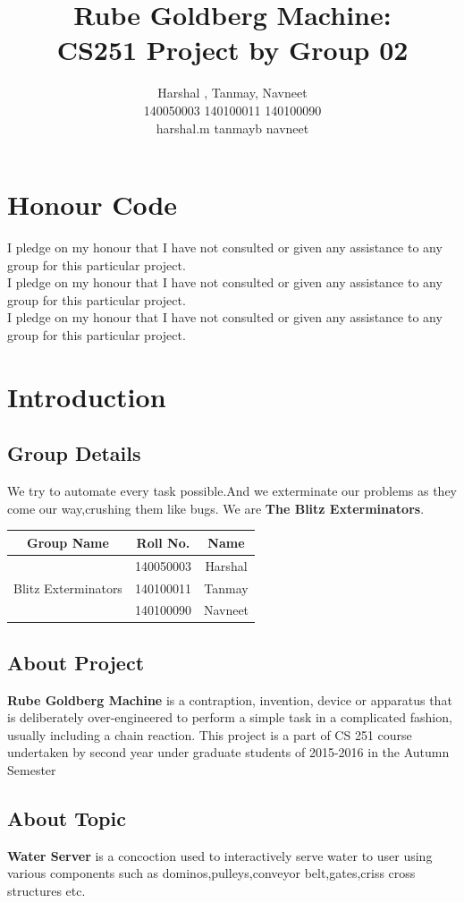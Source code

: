 \documentclass[]{report}
\title{Rube Goldberg Machine: \\CS251 Project by Group 02}
\author{Harshal ,  Tanmay, \quad Navneet\\140050003  140100011  140100090\\ harshal.m \quad  tanmayb \quad navneet}
\begin{document}
\maketitle
\tableofcontents
\newpage
\chapter{Honour Code}
I pledge on my honour that I have not consulted or given any assistance to any group for this particular project.
\\
I pledge on my honour that I have not consulted or given any assistance to any group for this particular project.
\\
I pledge on my honour that I have not consulted or given any assistance to any group for this particular project.
\chapter{Introduction}
\section{Group Details}
We try to automate every task possible.And we exterminate our problems as they come our way,crushing them like bugs. We are \textbf{The Blitz Exterminators}.
\begin{center}
\begin{tabular}{ |c|c|c|}
\hline
\textbf{Group Name} & \textbf{Roll No.} & \textbf{Name} \\
\hline
\multirow{3}{*}{Blitz Exterminators}& 140050003 & Harshal\\
& 140100011 & Tanmay \\
& 140100090 & Navneet\\
\hline
\end{tabular}
\end{center}
\hfill \break
\section{About Project}
\textbf{Rube Goldberg Machine} is a contraption, invention, device or apparatus that is deliberately over-engineered to perform a simple task in a complicated fashion, usually including a chain reaction. This project is a part of CS 251 course undertaken by second year under graduate students of 2015-2016 in the Autumn Semester

\section{About Topic}
\textbf{Water Server} is a concoction used to interactively serve water to user using various components such as dominos,pulleys,conveyor belt,gates,criss cross structures etc.
\end{document}
